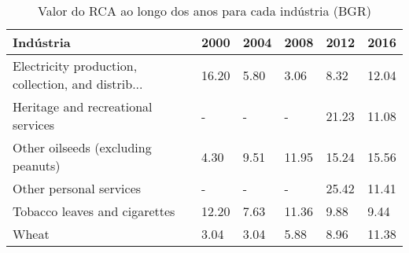 \begin{table}
\centering
\caption{Valor do RCA ao longo dos anos para cada indústria (BGR)}
\label{tab:ex3-tempo-BGR}
\begin{tabular}{p{6cm}p{1.5cm}p{1.5cm}p{1.5cm}p{1.5cm}p{1.5cm}}
\toprule
                                         Indústria &  2000 & 2004 &  2008 &  2012 &  2016 \\
\midrule
Electricity production, collection, and distrib... & 16.20 & 5.80 &  3.06 &  8.32 & 12.04 \\
                Heritage and recreational services &     - &    - &     - & 21.23 & 11.08 \\
                Other oilseeds (excluding peanuts) &  4.30 & 9.51 & 11.95 & 15.24 & 15.56 \\
                           Other personal services &     - &    - &     - & 25.42 & 11.41 \\
                     Tobacco leaves and cigarettes & 12.20 & 7.63 & 11.36 &  9.88 &  9.44 \\
                                             Wheat &  3.04 & 3.04 &  5.88 &  8.96 & 11.38 \\
\bottomrule
\end{tabular}
\end{table}
